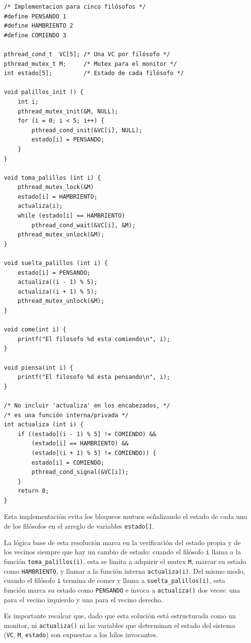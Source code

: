 \documentclass[11pt,fleqn]{book} %
\begin{document}
\begin{verbatim}
/* Implementacion para cinco filósofos */
#define PENSANDO 1
#define HAMBRIENTO 2
#define COMIENDO 3

pthread_cond_t  VC[5]; /* Una VC por filósofo */
pthread_mutex_t M;     /* Mutex para el monitor */
int estado[5];         /* Estado de cada filósofo */

void palillos_init () {
    int i;
    pthread_mutex_init(&M, NULL);
    for (i = 0; i < 5; i++) {
        pthread_cond_init(&VC[i], NULL);
        estado[i] = PENSANDO;
    }
}

void toma_palillos (int i) {
    pthread_mutex_lock(&M)
    estado[i] = HAMBRIENTO;
    actualiza(i);
    while (estado[i] == HAMBRIENTO)
        pthread_cond_wait(&VC[i], &M);
    pthread_mutex_unlock(&M);
}

void suelta_palillos (int i) {
    estado[i] = PENSANDO;
    actualiza((i - 1) % 5);
    actualiza((i + 1) % 5);
    pthread_mutex_unlock(&M);
}

void come(int i) {
    printf("El filosofo %d esta comiendo\n", i);
}

void piensa(int i) {
    printf("El filosofo %d esta pensando\n", i);
}

/* No incluir 'actualiza' en los encabezados, */
/* es una función interna/privada */
int actualiza (int i) {
    if ((estado[(i - 1) % 5] != COMIENDO) &&
        (estado[i] == HAMBRIENTO) &&
        (estado[(i + 1) % 5] != COMIENDO)) {
        estado[i] = COMIENDO;
        pthread_cond_signal(&VC[i]);
    }
    return 0;
}
\end{verbatim}

Esta implementación evita los bloqueos mutuos señalizando el estado de
cada uno de los filósofos en el arreglo de variables \texttt{estado[]}.

La lógica base de esta resolución marca en la verificación del estado
propia y de los vecinos siempre que hay un cambio de estado: cuando el
filósofo \texttt{i} llama a la función \texttt{toma\_palillos(i)}, esta se limita a
adquirir el mutex \texttt{M}, marcar su estado como \texttt{HAMBRIENTO}, y llamar a
la función interna \texttt{actualiza(i)}. Del mismo modo, cuando el filósofo
\texttt{i} termina de comer y llama a \texttt{suelta\_palillos(i)}, esta función
marca su estado como \texttt{PENSANDO} e invoca a \texttt{actualiza()} dos veces:
una para el vecino izquierdo y una para el vecino derecho.

Es importante recalcar que, dado que esta solución está estructurada
como un monitor, ni \texttt{actualiza()} ni las variables que determinan el
estado del sistema (\texttt{VC}, \texttt{M}, \texttt{estado}) son expuestas a los hilos
invocantes.
\end{document}
